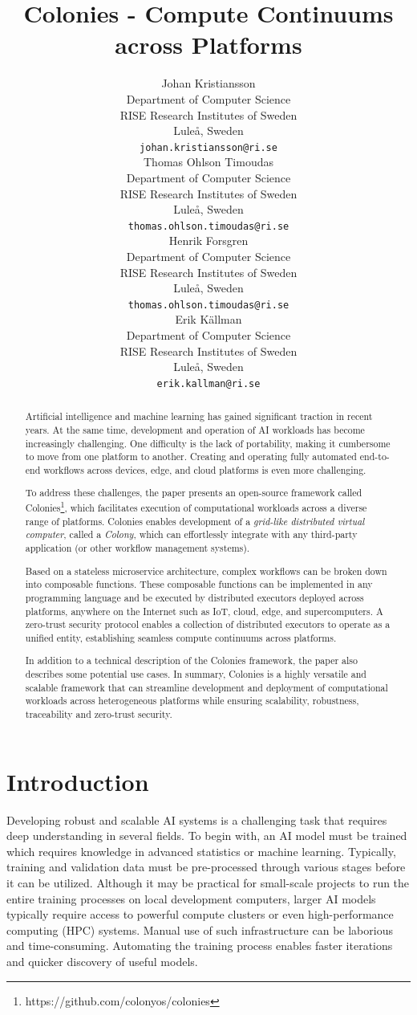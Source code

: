 \documentclass{article}
\title{Colonies - Compute Continuums across Platforms}
\author{{\hspace{1mm}Johan Kristiansson} \\
	Department of Computer Science \\
	RISE Research Institutes of Sweden \\
	Luleå, Sweden \\
	\texttt{johan.kristiansson@ri.se} \\
	\And
	{\hspace{1mm}Thomas Ohlson Timoudas} \\
	Department of Computer Science \\
	RISE Research Institutes of Sweden \\
	Luleå, Sweden \\
	\texttt{thomas.ohlson.timoudas@ri.se} \\
	\And
	{\hspace{1mm}Henrik Forsgren} \\
	Department of Computer Science \\
	RISE Research Institutes of Sweden \\
	Luleå, Sweden \\
	\texttt{thomas.ohlson.timoudas@ri.se} \\
	\And
	{\hspace{1mm}Erik Källman} \\
	Department of Computer Science \\
	RISE Research Institutes of Sweden \\
	Luleå, Sweden \\
	\texttt{erik.kallman@ri.se} \\
}
\begin{document}
\maketitle

\begin{abstract}
Artificial intelligence and machine learning has gained significant traction in recent years. At the same time, development and operation of AI workloads has become increasingly challenging. One difficulty is the lack of portability, making it cumbersome to move from one platform to another. Creating and operating fully automated end-to-end workflows across devices, edge, and cloud platforms is even more challenging. 

To address these challenges, the paper presents an open-source framework called Colonies\footnote{https://github.com/colonyos/colonies}, which facilitates execution of computational workloads across a diverse range of platforms. Colonies enables development of a \emph{grid-like distributed virtual computer}, called a \emph{Colony}, which can effortlessly integrate with any third-party application (or other workflow management systems).

Based on a stateless microservice architecture, complex workflows can be broken down into composable functions. These composable functions can be implemented in any programming language and be executed by distributed executors deployed across platforms, anywhere on the Internet such as IoT, cloud, edge, and supercomputers. A zero-trust security protocol enables a collection of distributed executors to operate as a unified entity, establishing seamless compute continuums across platforms.

In addition to a technical description of the Colonies framework, the paper also describes some potential use cases. In summary, Colonies is a highly versatile and scalable framework that can streamline development and deployment of computational workloads across heterogeneous platforms while ensuring scalability, robustness, traceability and zero-trust security.
\end{abstract}


\section{Introduction}
Developing robust and scalable AI systems is a challenging task that requires deep understanding in several fields. To begin with, an AI model must be trained which requires knowledge in advanced statistics or machine learning. Typically, training and validation data must be pre-processed through various stages before it can be utilized. Although it may be practical for small-scale projects to run the entire training processes on local development computers, larger AI models typically require access to powerful compute clusters or even high-performance computing (HPC) systems. Manual use of such infrastructure can be laborious and time-consuming. Automating the training process enables faster iterations and quicker discovery of useful models.
\end{document}
